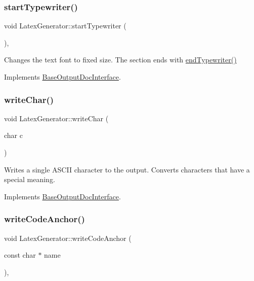 \subsubsection{\texorpdfstring{startTypewriter()}{startTypewriter()}}
{\footnotesize\ttfamily void Latex\+Generator\+::start\+Typewriter (\begin{DoxyParamCaption}{ }\end{DoxyParamCaption})\hspace{0.3cm}{\ttfamily [inline]}, {\ttfamily [virtual]}}

Changes the text font to fixed size. The section ends with \mbox{\hyperlink{class_latex_generator_a40c84d4660b7514fb336c18544005b52}{end\+Typewriter()}} 

Implements \mbox{\hyperlink{class_base_output_doc_interface_abde41a60b900d35b0b198f43731c1cd0}{Base\+Output\+Doc\+Interface}}.

\mbox{\label{class_latex_generator_a910e0329c0a8c8b54685d2335d22f690}} 
\subsubsection{\texorpdfstring{writeChar()}{writeChar()}}
{\footnotesize\ttfamily void Latex\+Generator\+::write\+Char (\begin{DoxyParamCaption}\item[{char}]{c }\end{DoxyParamCaption})\hspace{0.3cm}{\ttfamily [virtual]}}

Writes a single A\+S\+C\+II character to the output. Converts characters that have a special meaning. 

Implements \mbox{\hyperlink{class_base_output_doc_interface_a1577324720c1c71142dff84ae80b058d}{Base\+Output\+Doc\+Interface}}.

\mbox{\label{class_latex_generator_af9dc92f8c155f2bb2f5d969ea5ef7cff}} 
\subsubsection{\texorpdfstring{writeCodeAnchor()}{writeCodeAnchor()}}
{\footnotesize\ttfamily void Latex\+Generator\+::write\+Code\+Anchor (\begin{DoxyParamCaption}\item[{const char $\ast$}]{name }\end{DoxyParamCaption})\hspace{0.3cm}{\ttfamily [inline]}, {\ttfamily [virtual]}}

